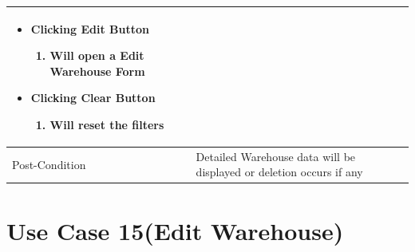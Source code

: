 \documentclass[12pt,a4paper]{report}
\begin{document}
\begin{tabular}{ | m{3cm} | m{12cm}| }
\begin{itemize}
\item Clicking Edit Button
	\begin{enumerate}
		\item Will open a Edit Warehouse Form
	\end{enumerate}
\item Clicking Clear Button
	\begin{enumerate}
	   	 \item	Will reset the filters
	\end{enumerate}
\end{itemize}
\\ \hline
Post-Condition &  Detailed Warehouse data will be displayed or deletion occurs if any   \\ \hline

\end{tabular}
\section{Use Case 15(Edit Warehouse) }
\end{document}
